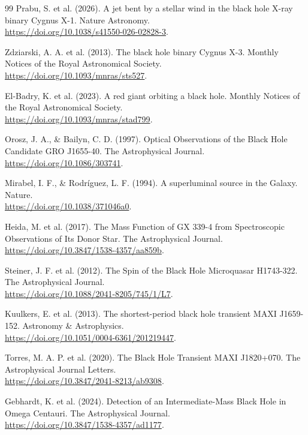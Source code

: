 \documentclass[11pt, a4paper]{article}
\begin{document}
\begin{thebibliography}{99}
  Prabu, S. et al. (2026). A jet bent by a stellar wind in the black hole X-ray binary Cygnus X-1. Nature Astronomy. \\ \url{https://doi.org/10.1038/s41550-026-02828-3}.

  Zdziarski, A. A. et al. (2013). The black hole binary Cygnus X-3. Monthly Notices of the Royal Astronomical Society. \\ \url{https://doi.org/10.1093/mnras/sts527}.

  El-Badry, K. et al. (2023). A red giant orbiting a black hole. Monthly Notices of the Royal Astronomical Society. \\ \url{https://doi.org/10.1093/mnras/stad799}.

  Orosz, J. A., \& Bailyn, C. D. (1997). Optical Observations of the Black Hole Candidate GRO J1655-40. The Astrophysical Journal. \\ \url{https://doi.org/10.1086/303741}.

  Mirabel, I. F., \& Rodríguez, L. F. (1994). A superluminal source in the Galaxy. Nature. \\ \url{https://doi.org/10.1038/371046a0}.

  Heida, M. et al. (2017). The Mass Function of GX 339-4 from Spectroscopic Observations of Its Donor Star. The Astrophysical Journal. \\ \url{https://doi.org/10.3847/1538-4357/aa859b}.

  Steiner, J. F. et al. (2012). The Spin of the Black Hole Microquasar H1743-322. The Astrophysical Journal. \\ \url{https://doi.org/10.1088/2041-8205/745/1/L7}.

  Kuulkers, E. et al. (2013). The shortest-period black hole transient MAXI J1659-152. Astronomy \& Astrophysics. \\ \url{https://doi.org/10.1051/0004-6361/201219447}.

  Torres, M. A. P. et al. (2020). The Black Hole Transient MAXI J1820+070. The Astrophysical Journal Letters. \\ \url{https://doi.org/10.3847/2041-8213/ab9308}.

  Gebhardt, K. et al. (2024). Detection of an Intermediate-Mass Black Hole in Omega Centauri. The Astrophysical Journal. \\ \url{https://doi.org/10.3847/1538-4357/ad1177}.


\end{thebibliography}
\end{document}
